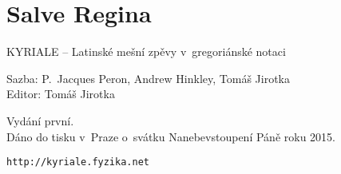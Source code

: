 \documentclass[12pt]{article} %
\begin{document}
\section{Salve Regina}


\vspace{1 cm}




\newpage
\tableofcontents




\newpage
\thispagestyle{empty}
\mbox{}

\begin{centering}
\setlength{\parskip}{1em}
\vspace{16cm}

	KYRIALE -- Latinské mešní zpěvy v~gregoriánské notaci

	Sazba: P.~Jacques Peron, Andrew Hinkley, Tomáš Jirotka\\
	Editor: Tomáš Jirotka

	Vydání první.\\
	Dáno do tisku v~Praze o~svátku Nanebevstoupení Páně roku 2015.

	{\tt http://kyriale.fyzika.net}

\end{centering}
\end{document}
